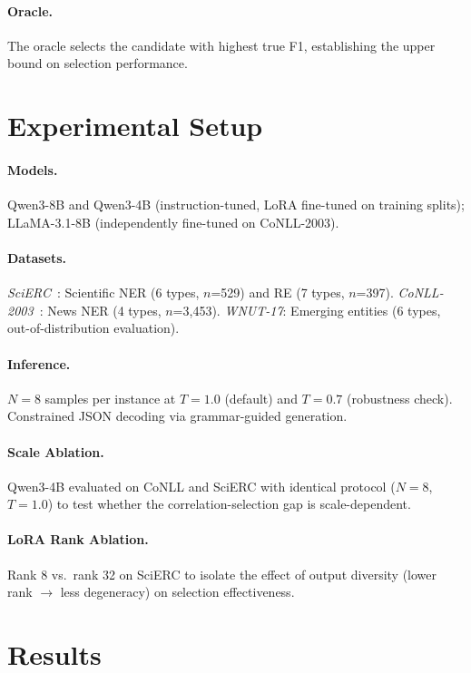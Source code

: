 \documentclass[11pt,a4paper]{article}
\begin{document}
\paragraph{Oracle.}
The oracle selects the candidate with highest true F1, establishing the upper bound on selection performance.

\section{Experimental Setup}

\paragraph{Models.}
Qwen3-8B and Qwen3-4B (instruction-tuned, LoRA fine-tuned on training splits); LLaMA-3.1-8B (independently fine-tuned on CoNLL-2003).

\paragraph{Datasets.}
\emph{SciERC}~\citep{luan2018scierc}: Scientific NER (6 types, $n$=529) and RE (7 types, $n$=397).
\emph{CoNLL-2003}~\citep{tjong2003conll}: News NER (4 types, $n$=3,453).
\emph{WNUT-17}: Emerging entities (6 types, out-of-distribution evaluation).

\paragraph{Inference.}
$N=8$ samples per instance at $T=1.0$ (default) and $T=0.7$ (robustness check).
Constrained JSON decoding via grammar-guided generation.

\paragraph{Scale Ablation.}
Qwen3-4B evaluated on CoNLL and SciERC with identical protocol ($N=8$, $T=1.0$) to test whether the correlation-selection gap is scale-dependent.

\paragraph{LoRA Rank Ablation.}
Rank 8 vs.\ rank 32 on SciERC to isolate the effect of output diversity (lower rank $\to$ less degeneracy) on selection effectiveness.

\section{Results}
\end{document}
